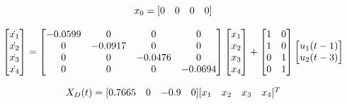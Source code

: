 \begin{equation}
    \centering
    x_0 = 
    \begin{matrix}
        [0 & 0 & 0 & 0]
    \end{matrix}
\end{equation}

\begin{equation}
    \centering
    \begin{bmatrix}
        \dot{x_1} \\
        \dot{x_2} \\
        \dot{x_3} \\
        \dot{x_4} 
    \end{bmatrix}
    =
    \begin{bmatrix}
        -0.0599     &     0     &     0     &     0 \\
        0           &  -0.0917  &     0     &     0 \\
        0           &     0     &   -0.0476 &     0 \\
        0           &     0     &     0     &  -0.0694
    \end{bmatrix}
    \begin{bmatrix}
        x_1 \\
        x_2 \\
        x_3 \\
        x_4 
    \end{bmatrix}
    +
    \begin{bmatrix}
        1     &     0  \\
        1     &     0  \\
        0     &     1  \\
        0     &     1
    \end{bmatrix}
    \begin{bmatrix}
        u_1(t - 1) \\
        u_2(t - 3)
    \end{bmatrix}
    \label{eq: x_ss_eq1}
\end{equation}

\begin{equation}
    \centering
    X_D(t) =  
    \begin{matrix}
        [0.7665 & 0 & -0.9 & 0]
    \end{matrix}
    \begin{matrix}
        [x_1 & x_2 & x_3 & x_4]^T
    \end{matrix}
    \label{eq: X_D_output}
\end{equation}

